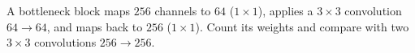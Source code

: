 \begin{notechapter}
\begin{exercise}\label{cnn-architectures:exr:4}
A bottleneck block maps $256$ channels to $64$ ($1\times1$), applies a $3\times3$ convolution $64\to64$, and maps back to
$256$ ($1\times1$). Count its weights and compare with two $3\times3$ convolutions $256\to256$.
\end{exercise}
\end{notechapter}
